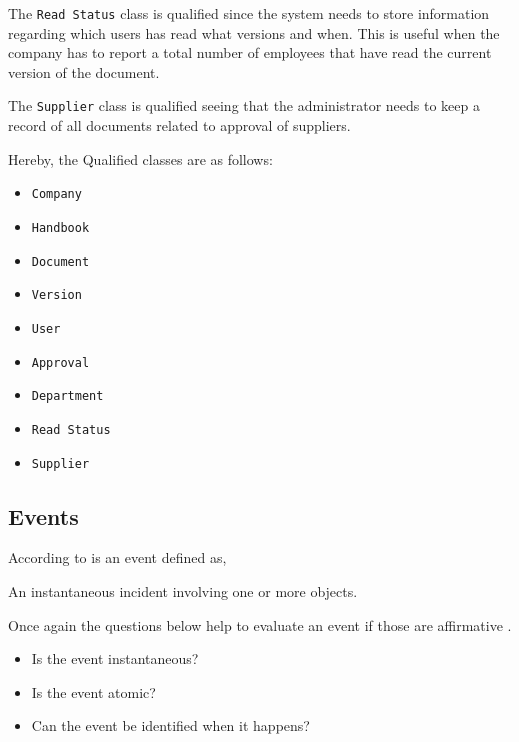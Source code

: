 The \texttt{Read Status} class is qualified since the system needs to store information regarding which users has read what versions and when.
This is useful when the company has to report a total number of employees that have read the current version of the document.

The \texttt{Supplier} class is qualified seeing that the administrator needs to keep a record of all documents related to approval of suppliers. 

Hereby, the Qualified classes are as follows:
\begin{multicols}{4}
	\begin{itemize} 
	\item \texttt{Company}
	\item \texttt{Handbook}
	\item \texttt{Document}
	\item \texttt{Version}
	\item \texttt{User}
	\item \texttt{Approval}
	\item \texttt{Department}
	\item \texttt{Read Status}
	\item \texttt{Supplier}
	\end{itemize}
\end{multicols}

\subsection{Events} \label{sec:Events}
According to \citep[p.~53]{Rod-Aalborg} is an event defined as,
\begin{defn}\label{defn:Event}
An instantaneous incident involving one or more objects.	
\end{defn}
Once again the questions below help to evaluate an event if those are affirmative \citep[p.~65]{Rod-Aalborg}.
\begin{itemize}
	\item Is the event instantaneous?
	\item Is the event atomic?
	\item Can the event be identified when it happens?
\end{itemize}

